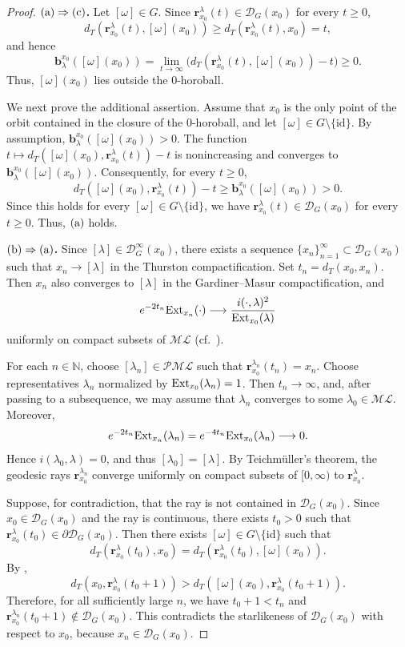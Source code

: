 \documentclass[dvipdfmx]{amsart}
\theoremstyle{remark}
\newcommand{\ext}{{\rm Ext}}
\newcommand{\ray}{{\boldsymbol r}}
\newcommand{\ml}{\mathcal{ML}}
\newcommand{\pml}{\mathcal{PML}}
\newcommand{\busemann}{\boldsymbol{b}}
\newcommand{\Dirichlet}{\mathscr{D}}
\begin{document}
\begin{proof}
\noindent
\textbf{${\rm (a)}\Rightarrow {\rm (c)}$.}
Let $[\omega]\in G$. Since $\ray^\lambda_{x_0}(t)\in \Dirichlet_G(x_0)$ for every $t\ge 0$,
\[
d_T(\ray^\lambda_{x_0}(t),[\omega](x_0))
\ge d_T(\ray^\lambda_{x_0}(t),x_0)=t,
\]
and hence
\[
\busemann^{x_0}_\lambda([\omega](x_0))
=\lim_{t\to\infty}
\bigl(d_T(\ray^\lambda_{x_0}(t),[\omega](x_0))-t\bigr)
\ge 0.
\]
Thus, $[\omega](x_0)$ lies outside the $0$-horoball.

We next prove the additional assertion. Assume that $x_0$ is the only point of the orbit contained in the closure of the $0$-horoball, and let $[\omega]\in G\setminus\{\mathrm{id}\}$. By assumption,
$\busemann^{x_0}_\lambda([\omega](x_0))>0$. The function
$t\mapsto d_T([\omega](x_0),\ray^\lambda_{x_0}(t))-t$ is nonincreasing and converges to $\busemann^{x_0}_\lambda([\omega](x_0))$. Consequently, for every $t\ge0$,
\[
d_T([\omega](x_0),\ray^\lambda_{x_0}(t))-t
\ge\busemann^{x_0}_\lambda([\omega](x_0))>0.
\]
Since this holds for every $[\omega]\in G\setminus\{\mathrm{id}\}$, we have $\ray^\lambda_{x_0}(t)\in\Dirichlet_G(x_0)$ for every $t\ge0$. Thus, ${\rm (a)}$ holds.

\medskip
\noindent
\textbf{${\rm (b)}\Rightarrow {\rm (a)}$.}
Since $[\lambda]\in \Dirichlet^\infty_G(x_0)$, there exists a sequence $\{x_n\}_{n=1}^\infty\subset \Dirichlet_G(x_0)$ such that $x_n\to[\lambda]$ in the Thurston compactification. Set $t_n=d_T(x_0,x_n)$. Then $x_n$ also converges to $[\lambda]$ in the Gardiner--Masur compactification, and
\[
e^{-2t_n}\ext_{x_n}(\cdot)
\longrightarrow \frac{i(\cdot,\lambda)^2}{\ext_{x_0}(\lambda)}
\]
uniformly on compact subsets of $\ml$ (cf.\ \cite[Corollaries 1 and 2]{Miyachi2013}).

For each $n\in\mathbb{N}$, choose $[\lambda_n]\in\pml$ such that
$\ray^{\lambda_n}_{x_0}(t_n)=x_n$. Choose representatives $\lambda_n$ normalized by $\ext_{x_0}(\lambda_n)=1$. Then $t_n\to\infty$, and, after passing to a subsequence, we may assume that $\lambda_n$ converges to some $\lambda_0\in\ml$. Moreover,
\[
e^{-2t_n}\ext_{x_n}(\lambda_n)
=e^{-4t_n}\ext_{x_0}(\lambda_n)\longrightarrow 0.
\]
Hence $i(\lambda_0,\lambda)=0$, and thus $[\lambda_0]=[\lambda]$. By Teichm\"uller's theorem, the geodesic rays $\ray^{\lambda_n}_{x_0}$ converge uniformly on compact subsets of $[0,\infty)$ to $\ray^\lambda_{x_0}$.

Suppose, for contradiction, that the ray is not contained in $\Dirichlet_G(x_0)$. Since $x_0\in\Dirichlet_G(x_0)$ and the ray is continuous, there exists $t_0>0$ such that $\ray^\lambda_{x_0}(t_0)\in\partial\Dirichlet_G(x_0)$. Then there exists $[\omega]\in G\setminus\{\mathrm{id}\}$ such that
\[
d_T(\ray^\lambda_{x_0}(t_0),x_0)
=d_T(\ray^\lambda_{x_0}(t_0),[\omega](x_0)).
\]
By \cite[Lemma 4.5]{McCarthyPapadopoulos1996},
\[
d_T(x_0,\ray^\lambda_{x_0}(t_0+1))
>d_T([\omega](x_0),\ray^\lambda_{x_0}(t_0+1)).
\]
Therefore, for all sufficiently large $n$, we have $t_0+1<t_n$ and
$\ray^{\lambda_n}_{x_0}(t_0+1)\notin\Dirichlet_G(x_0)$. This contradicts the starlikeness of $\Dirichlet_G(x_0)$ with respect to $x_0$, because $x_n\in\Dirichlet_G(x_0)$.


\end{proof}
\end{document}
